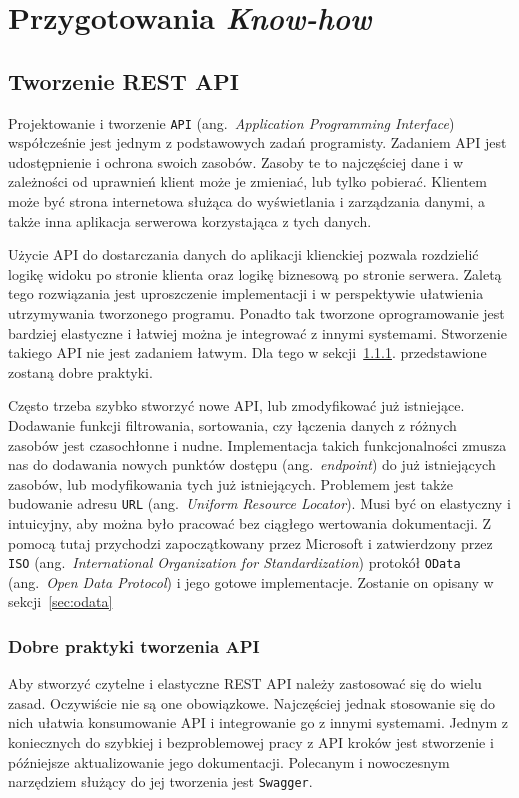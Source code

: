 \chapter{Przygotowania \emph{Know-how}}
\section{Tworzenie REST API}
Projektowanie i tworzenie \texttt{API} (ang.~\emph{Application Programming Interface}) współcześnie jest jednym z podstawowych zadań programisty. Zadaniem API jest udostępnienie i ochrona swoich zasobów. Zasoby te to najczęściej dane i w zależności od uprawnień klient może je zmieniać, lub tylko pobierać. Klientem może być strona internetowa służąca do wyświetlania i zarządzania danymi, a także inna aplikacja serwerowa korzystająca z tych danych.

Użycie API do dostarczania danych do aplikacji klienckiej pozwala rozdzielić logikę widoku po stronie klienta oraz logikę biznesową po stronie serwera. Zaletą tego rozwiązania jest uproszczenie implementacji i w perspektywie ułatwienia utrzymywania tworzonego programu. Ponadto tak tworzone oprogramowanie jest bardziej elastyczne i łatwiej można je integrować z innymi systemami. Stworzenie takiego API nie jest zadaniem łatwym. Dla tego w sekcji~\ref{sec:api-dobre-praktyki}. przedstawione zostaną dobre praktyki.

Często trzeba szybko stworzyć nowe API, lub zmodyfikować już istniejące. Dodawanie funkcji filtrowania, sortowania, czy łączenia danych z różnych zasobów jest czasochłonne i nudne. Implementacja takich funkcjonalności zmusza nas do dodawania nowych punktów dostępu (ang.~\emph{endpoint}) do już istniejących zasobów, lub modyfikowania tych już istniejących. Problemem jest także budowanie adresu \texttt{URL} (ang.~\emph{Uniform Resource Locator}). Musi być on elastyczny i intuicyjny, aby można było pracować bez ciągłego wertowania dokumentacji. Z pomocą tutaj przychodzi zapoczątkowany przez Microsoft i zatwierdzony przez \texttt{ISO} (ang.~\emph{International Organization for Standardization}) protokół \texttt{OData} (ang.~\emph{Open Data Protocol}) i jego gotowe implementacje. Zostanie on opisany w sekcji~\ref{sec:odata}

\subsection{Dobre praktyki tworzenia API} 
\label{sec:api-dobre-praktyki}
Aby stworzyć czytelne i elastyczne REST API należy zastosować się do wielu zasad. Oczywiście nie są one obowiązkowe. Najczęściej jednak stosowanie się do nich ułatwia konsumowanie API i integrowanie go z innymi systemami. Jednym z koniecznych do szybkiej i bezproblemowej pracy z API kroków jest stworzenie i późniejsze aktualizowanie jego dokumentacji. Polecanym i nowoczesnym narzędziem służący do jej tworzenia jest \texttt{Swagger}. 

